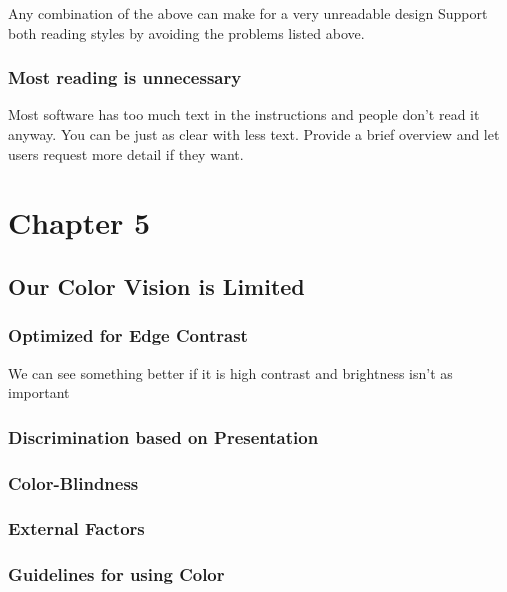 \documentclass[11pt,]{article}
\begin{document}
Any combination of the above can make for a very unreadable design
Support both reading styles by avoiding the problems listed above.

\hypertarget{most-reading-is-unnecessary}{%
\subsubsection{Most reading is
unnecessary}\label{most-reading-is-unnecessary}}

Most software has too much text in the instructions and people don't
read it anyway. You can be just as clear with less text. Provide a brief
overview and let users request more detail if they want.

\hypertarget{chapter-5}{%
\section{Chapter 5}\label{chapter-5}}

\hypertarget{our-color-vision-is-limited}{%
\subsection{Our Color Vision is
Limited}\label{our-color-vision-is-limited}}

\hypertarget{optimized-for-edge-contrast}{%
\subsubsection{Optimized for Edge
Contrast}\label{optimized-for-edge-contrast}}

We can see something better if it is high contrast and brightness isn't
as important

\hypertarget{discrimination-based-on-presentation}{%
\subsubsection{Discrimination based on
Presentation}\label{discrimination-based-on-presentation}}

\hypertarget{color-blindness}{%
\subsubsection{Color-Blindness}\label{color-blindness}}

\hypertarget{external-factors}{%
\subsubsection{External Factors}\label{external-factors}}

\hypertarget{guidelines-for-using-color}{%
\subsubsection{Guidelines for using
Color}\label{guidelines-for-using-color}}
\end{document}
